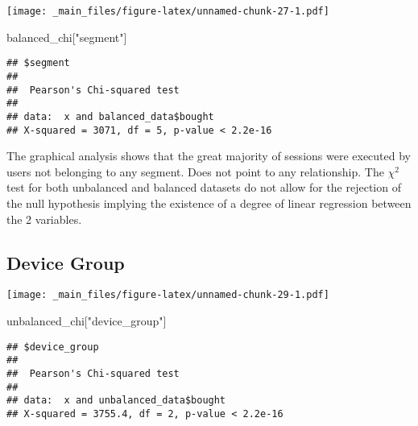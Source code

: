 \documentclass[
]{book}
\newenvironment{Shaded}{\begin{snugshade}}{\end{snugshade}}
\newcommand{\FunctionTok}[1]{\textcolor[rgb]{0.00,0.00,0.00}{#1}}
\newcommand{\NormalTok}[1]{#1}
\newcommand{\SpecialCharTok}[1]{\textcolor[rgb]{0.00,0.00,0.00}{#1}}
\newcommand{\StringTok}[1]{\textcolor[rgb]{0.31,0.60,0.02}{#1}}
\begin{document}
\texttt{[image: \_main\_files/figure-latex/unnamed-chunk-27-1.pdf]}

\begin{Shaded}
\begin{Highlighting}[]
\NormalTok{balanced\_chi[}\StringTok{"segment"}\NormalTok{]}
\end{Highlighting}
\end{Shaded}

\begin{verbatim}
## $segment
## 
##  Pearson's Chi-squared test
## 
## data:  x and balanced_data$bought
## X-squared = 3071, df = 5, p-value < 2.2e-16
\end{verbatim}

The graphical analysis shows that the great majority of sessions were executed by users not belonging to any segment. Does not point to any relationship. The \(\chi ^2\) test for both unbalanced and balanced datasets do not allow for the rejection of the null hypothesis implying the existence of a degree of linear regression between the 2 variables.

\hypertarget{device-group}{%
\subsection{Device Group}\label{device-group}}

\begin{Shaded}
\end{Shaded}

\texttt{[image: \_main\_files/figure-latex/unnamed-chunk-29-1.pdf]}

\begin{Shaded}
\begin{Highlighting}[]
\NormalTok{unbalanced\_chi[}\StringTok{"device\_group"}\NormalTok{]}
\end{Highlighting}
\end{Shaded}

\begin{verbatim}
## $device_group
## 
##  Pearson's Chi-squared test
## 
## data:  x and unbalanced_data$bought
## X-squared = 3755.4, df = 2, p-value < 2.2e-16
\end{verbatim}

\begin{Shaded}
\end{Shaded}
\end{document}
